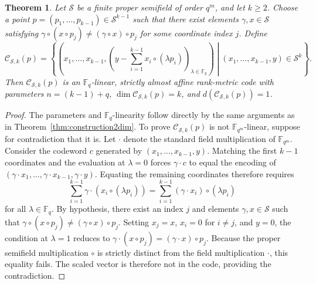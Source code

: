 \documentclass[a4paper,11pt,reqno]{article}
\newcommand{\F}{\mathbb{F}}
\newcommand{\C}{\mathcal{C}}
\renewcommand{\S}{\mathcal{S}}
\theoremstyle{plain} \numberwithin{equation}{section}
\newtheorem{theorem}{Theorem}[section]
\theoremstyle{definition}
\begin{document}
\begin{theorem} Let $\S$ be a finite proper semifield of order $q^m$, and let $k\geq 2$. Choose a point $p =(p_1,\ldots,p_{k-1})\in \S^{k-1}$ such that there exist elements $\gamma,x\in \S$ satisfying $\gamma \circ (x\circ p_j) \neq (\gamma\circ x)\circ p_j$ for some coordinate index $j$. Define
\[
    \C_{\S,k}(p) = \left\{ \left(x_1,\ldots,x_{k-1},\left( y - \sum^{k-1}_{i=1}x_i \circ (\lambda p_i) \right)_{\lambda \in \F_q} \right) \middle| (x_1,\ldots,x_{k-1},y)\in \S^k \right\}.
\]
Then $\C_{\S,k}(p)$ is an $\F_q$-linear, strictly almost affine rank-metric code with parameters $n=(k-1)+q$, $\dim \C_{\S,k}(p) = k$, and $d(\C_{\S,k}(p)) = 1$. \label{thm:constructionkdim}
\end{theorem}
\begin{proof}
The parameters and $\F_q$-linearity follow directly by the same arguments as in Theorem~\ref{thm:construction2dim}. To prove $\mathcal{C}_{\mathcal{S},k}(p)$ is not $\mathbb{F}_{q^m}$-linear, suppose for contradiction that it is. Let $\cdot$ denote the standard field multiplication of $\F_{q^m}$. Consider the codeword $c$ generated by $(x_1, \dots, x_{k-1}, y)$. Matching the first $k-1$ coordinates and the evaluation at $\lambda = 0$ forces $\gamma \cdot c$ to equal the encoding of $(\gamma \cdot x_1, \dots, \gamma \cdot x_{k-1}, \gamma \cdot y)$. Equating the remaining coordinates therefore requires
    $$\sum_{i=1}^{k-1} \gamma \cdot (x_i \circ (\lambda p_i)) = \sum_{i=1}^{k-1} (\gamma \cdot x_i) \circ (\lambda p_i)$$
for all $\lambda \in \mathbb{F}_q$. By hypothesis, there exist an index $j$ and elements $\gamma, x \in \mathcal{S}$ such that $\gamma \circ (x \circ p_j) \neq (\gamma \circ x) \circ p_j$. Setting $x_j = x$, $x_i = 0$ for $i \neq j$, and $y = 0$, the condition at $\lambda = 1$ reduces to $\gamma \cdot (x \circ p_j) = (\gamma \cdot x) \circ p_j$. Because the proper semifield multiplication $\circ$ is strictly distinct from the field multiplication $\cdot$, this equality fails. The scaled vector is therefore not in the code, providing the contradiction.


\end{proof}
\end{document}
